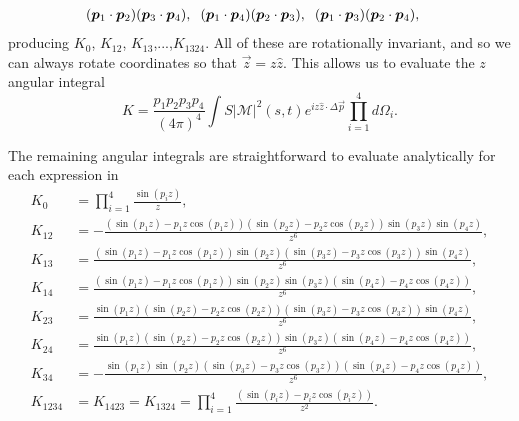 \begin{subappendices}
\begin{align}
& (\vec p_1 \cdot\vec p_2)(\vec p_3\cdot\vec p_4 ),\hspace{2mm}(\vec p_1 \cdot\vec p_4 )(\vec p_2\cdot\vec p_3),\hspace{2mm} (\vec p_1 \cdot\vec p_3)(\vec p_2\cdot\vec p_4 ),
\end{align}
producing $K_0$, $K_{12}$, $K_{13}$,...,$K_{1324}$.  All of these are rotationally invariant, and so we can always rotate coordinates so that $\vec z=z\hat z$.  This allows us to evaluate the $z$ angular integral
\begin{equation}
K=\frac{p_1p_2p_3p_4}{(4\pi)^4}\int S|\mathcal{M}|^2(s,t)e^{iz \hat z\cdot\Delta\vec p}\prod_{i=1}^4d\Omega_i.
\end{equation}

The remaining angular integrals are straightforward to evaluate analytically for each expression in 
\begin{align}
K_0&=\prod_{i=1}^4\frac{\sin(p_iz)}{z},\\
K_{12}&=-\frac{(\sin(p_1z)-p_1z\cos(p_1z))(\sin(p_2z)-p_2z\cos(p_2z))\sin(p_3z)\sin(p_4z)}{z^6},\\
K_{13}&=\frac{(\sin(p_1z)-p_1z\cos(p_1z))\sin(p_2z)(\sin(p_3z)-p_3z\cos(p_3z))\sin(p_4z)}{z^6},\\
K_{14}&=\frac{(\sin(p_1z)-p_1z\cos(p_1z))\sin(p_2z)\sin(p_3z)(\sin(p_4z)-p_4z\cos(p_4z))}{z^6},\\
K_{23}&=\frac{\sin(p_1z)(\sin(p_2z)-p_2z\cos(p_2z))(\sin(p_3z)-p_3z\cos(p_3z))\sin(p_4z)}{z^6},\\
K_{24}&=\frac{\sin(p_1z)(\sin(p_2z)-p_2z\cos(p_2z))\sin(p_3z)(\sin(p_4z)-p_4z\cos(p_4z))}{z^6},\\
K_{34}&=-\frac{\sin(p_1z)\sin(p_2z)(\sin(p_3z)-p_3z\cos(p_3z))(\sin(p_4z)-p_4z\cos(p_4z))}{z^6},\\
K_{1234}&=K_{1423}=K_{1324}=\prod_{i=1}^4\frac{(\sin(p_iz)-p_iz\cos(p_iz))}{z^2}.
\end{align}


\end{subappendices}
